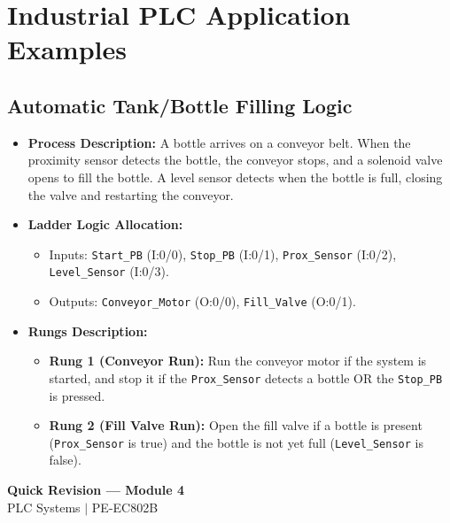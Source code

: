 \documentclass[12pt,a4paper]{article}
\begin{document}
\section{Industrial PLC Application Examples}

\subsection{Automatic Tank/Bottle Filling Logic}
\begin{itemize}[leftmargin=*, itemsep=2.5pt]
  \item \textbf{Process Description:} A bottle arrives on a conveyor belt. When the proximity sensor detects the bottle, the conveyor stops, and a solenoid valve opens to fill the bottle. A level sensor detects when the bottle is full, closing the valve and restarting the conveyor.
  \item \textbf{Ladder Logic Allocation:}
    \begin{itemize}[leftmargin=*, itemsep=2pt]
      \item Inputs: \texttt{Start\_PB} (I:0/0), \texttt{Stop\_PB} (I:0/1), \texttt{Prox\_Sensor} (I:0/2), \texttt{Level\_Sensor} (I:0/3).
      \item Outputs: \texttt{Conveyor\_Motor} (O:0/0), \texttt{Fill\_Valve} (O:0/1).
    \end{itemize}
  \item \textbf{Rungs Description:}
    \begin{itemize}[leftmargin=*, itemsep=2pt]
      \item \textbf{Rung 1 (Conveyor Run):} Run the conveyor motor if the system is started, and stop it if the \texttt{Prox\_Sensor} detects a bottle OR the \texttt{Stop\_PB} is pressed.
      \item \textbf{Rung 2 (Fill Valve Run):} Open the fill valve if a bottle is present (\texttt{Prox\_Sensor} is true) and the bottle is not yet full (\texttt{Level\_Sensor} is false).
    \end{itemize}
\end{itemize}

\newpage

\begin{center}
  {\large\bfseries\color{myred} Quick Revision --- Module 4}\\[3pt]
  {\small\color{mydark} PLC Systems $|$ PE-EC802B}
\end{center}
\noindent{\color{myred}\rule{\linewidth}{1.2pt}}
\vspace{4pt}
\end{document}
